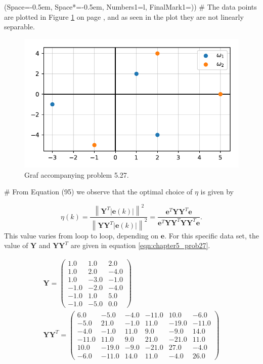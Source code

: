 \documentclass[12pt, a4paper]{article}
\newcommand{\listSpace}{-0.5em}%
\newcommand{\vect}[1]{\bm{#1}}
\newcommand{\norm}[1]{\left\lVert#1\right\rVert}
\newcommand{\abs}[1]{\left\lvert#1\right\rvert}
\begin{document}
\begin{easylist}[enumerate]
\ListProperties(Space=\listSpace, Space*=\listSpace, Numbers1=l, FinalMark1={)})
# The data points are plotted in Figure \ref{fig:duda_ch5_prob27} on page \pageref{fig:duda_ch5_prob27}, and as seen in the plot they are not linearly separable.


\begin{figure}[ht!]
	\centering
	\includegraphics[width=0.5\linewidth]{figs/duda_ch5_prob27}
	\caption{Graf accompanying problem 5.27.}
	\label{fig:duda_ch5_prob27}
\end{figure}


# From Equation (95) we observe that the optimal choice of $\eta$ is given by

\begin{equation*}
	\eta(k) = \frac{\norm{\vect{Y}^T \abs{\vect{e}(k)}}^2}
	{\norm{\vect{Y}\vect{Y}^T \abs{\vect{e}(k)}}^2}
	= \frac{\vect{e}^T \vect{Y} \vect{Y}^T \vect{e}}
	{\vect{e}^T \vect{Y} \vect{Y}^T \vect{Y} \vect{Y}^T \vect{e}}.
\end{equation*}
This value varies from loop to loop, depending on $\vect{e}$.
For this specific data set, the value of $\vect{Y}$ and $\vect{Y} \vect{Y}^T$ are given in equation \eqref{eqn:chapter5_prob27}.

\begin{gather*}
\label{eqn:chapter5_prob27}
	\vect{Y} = \left(\begin{matrix}
	1.0 & 1.0 & 2.0\\1.0 & 2.0 & -4.0\\1.0 & -3.0 & -1.0\\-1.0 & -2.0 & -4.0\\-1.0 & 1.0 & 5.0\\-1.0 & -5.0 & 0.0
	\end{matrix}\right)
	\\
	\vect{Y} \vect{Y}^T = 
	\left(\begin{matrix}
	6.0 & -5.0 & -4.0 & -11.0 & 10.0 & -6.0\\-5.0 & 21.0 & -1.0 & 11.0 & -19.0 & -11.0\\-4.0 & -1.0 & 11.0 & 9.0 & -9.0 & 14.0\\-11.0 & 11.0 & 9.0 & 21.0 & -21.0 & 11.0\\10.0 & -19.0 & -9.0 & -21.0 & 27.0 & -4.0\\-6.0 & -11.0 & 14.0 & 11.0 & -4.0 & 26.0
	\end{matrix}\right)
\end{gather*}


\end{easylist}
\end{document}

